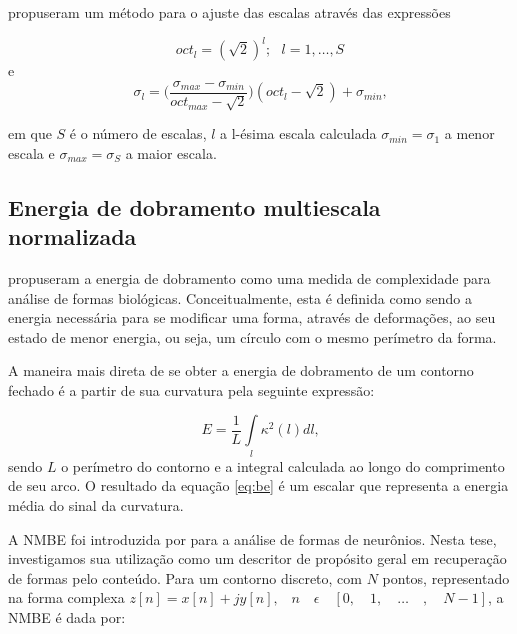  propuseram um método para o ajuste das escalas através das expressões

\begin{equation}
oct_l = (\sqrt{2})^l;\text{ }l = 1,\ldots,S
\end{equation} 
\noindent e
\begin{equation}
\sigma_l = \big(\frac{\sigma_{max} - \sigma_{min}}{oct_{max}-\sqrt{2}}\big)(oct_l - \sqrt{2})+\sigma_{min}\text{,}
\end{equation}

\noindent em que $S$ é o número de escalas, $l$ a l-ésima escala calculada $\sigma_{min} = \sigma_1$ a menor escala e $\sigma_{max} = \sigma_S$ a maior escala.

\subsection*{Energia de dobramento multiescala normalizada\label{subsec:BE}}

 propuseram a energia de dobramento como uma medida de complexidade para análise de formas biológicas. Conceitualmente, esta é definida como sendo a energia necessária para se modificar uma forma, através de deformações, ao seu estado de menor energia, ou seja, um círculo com o mesmo perímetro da forma.

A maneira mais direta de se obter a energia de dobramento de um contorno fechado é a partir de sua curvatura pela seguinte expressão:

\begin{equation}\label{eq:be}
E = \frac{1}{L}\int\limits_{l}\kappa^2(l)dl\text{,}
\end{equation}
\noindent
sendo $L$ o perímetro do contorno e a integral calculada ao longo do comprimento de seu arco. O resultado da equação \ref{eq:be} é um escalar que representa a energia média do sinal da curvatura.

\begin{comment}
A energia de dobramento multiescala é obtida a partir da curvatura multiescala repetindo-se o cálculo da equação \ref{eq:be} para diferentes níveis de suavização do contorno. Isso resulta em um vetor de características composto por escalares decorrentes da curvatura multiescala para cada uma das escalas empregadas na suavização do contorno e cálculo da curvatura. 
\end{comment}

A \acl{NMBE} foi introduzida por  para a análise de formas de neurônios. Nesta tese, investigamos sua utilização como um descritor de propósito geral em recuperação de formas pelo conteúdo. Para um contorno discreto, com $N$ pontos, representado na forma complexa $z[n] = x[n]+jy[n] \text{,} \quad n \quad \epsilon \quad [0, \quad 1, \quad \ldots \quad , \quad N-1]$, a \ac{NMBE} é dada por: 

